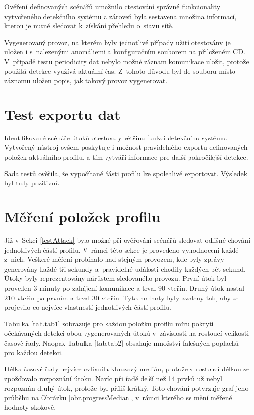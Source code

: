   Ověření definovaných scénářů umožnilo otestování správné funkcionality vytvořeného detekčního
  systému a zároveň byla sestavena množina informací, kterou je nutné sledovat k~získání 
  přehledu o~stavu sítě.
  
  Vygenerovaný provoz, na kterém byly jednotlivé případy užití otestovány je uložen i s~nalezenými
  anomáliemi a konfiguračním souborem na přiloženém CD. V~případě testu periodicity dat nebylo možné záznam 
  komunikace uložit, protože použitá detekce využívá aktuální čas. Z~tohoto důvodu 
  byl do souboru místo záznamu uložen popis, jak takový provoz vygenerovat.

\section{Test exportu dat}
Identifikované scénáře útoků otestovaly většinu funkcí detekčního systému. Vytvořený nástroj
ovšem poskytuje i možnost pravidelného exportu definovaných položek aktuálního profilu, a tím 
vytváří informace pro další pokročilejší detekce. 

Sada testů ověřila, že vypočítané části profilu lze spolehlivě exportovat. Výsledek byl tedy
pozitivní.

\section{Měření položek profilu}
Již v~Sekci \ref{testAttack} bylo možné při ověřování scénářů sledovat odlišné chování 
jednotlivých částí profilu. V~rámci této sekce je provedeno vyhodnocení každé z~nich. Veškeré 
měření probíhalo nad stejným provozem, kde byly zprávy generovány každé tři sekundy a~pravidelné
události chodily každých pět sekund. Útoky byly reprezentovány nárůstem sledovaného provozu.
První útok byl proveden 3 minuty po zahájení komunikace a trval 90 vteřin. Druhý útok nastal 210
vteřin po prvním a trval 30 vteřin. Tyto hodnoty byly zvoleny tak, aby se projevilo co nejvíce
vlastností jednotlivých částí profilu. 

Tabulka \ref{tab.tab1} zobrazuje pro každou položku profilu míru pokrytí očekávaných detekcí obou
vygenerovaných útoků v~závislosti na 
rostoucí velikosti časové řady. Naopak Tabulka \ref{tab.tab2} obsahuje množství falešných
poplachů pro každou detekci. 

Délka časové řady nejvíce ovlivnila klouzavý medián, protože
s~rostoucí délkou se zpožďovalo rozpoznání útoku. Navíc při řadě delší než 14 prvků už nebyl rozpoznán
druhý útok, protože byl příliš krátký. Toto chování potvrzuje graf jeho průběhu
na Obrázku \ref{obr.progressMedian}, v~rámci kterého se mění měřené hodnoty skokově.

